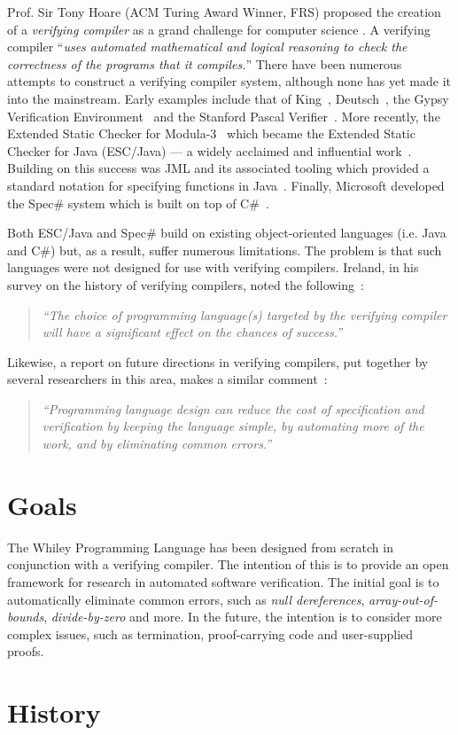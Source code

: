 Prof. Sir Tony Hoare (ACM Turing Award Winner, FRS) proposed the
creation of a {\em verifying compiler} as a grand challenge for
computer science \cite{Hoare03}.  A verifying compiler ``{\em uses
  automated mathematical and logical reasoning to check the
  correctness of the programs that it compiles.}''  There have been
numerous attempts to construct a verifying compiler system, although
none has yet made it into the mainstream.  Early examples include that
of King~\cite{King69}, Deutsch~\cite{Deutsch73}, the Gypsy
Verification Environment~\cite{Good85} and the Stanford Pascal
Verifier~\cite{LGHKMOPS95}.  More recently, the Extended Static
Checker for Modula-3~\cite{DLNS98} which became the Extended Static
Checker for Java (ESC/Java) --- a widely acclaimed and influential work~\cite{FLLNSS02}.  Building on this success was JML and its
associated tooling which provided a standard notation for specifying
functions in Java~\cite{LCCRC05}.  Finally, Microsoft %
developed the Spec\# system which is built on top of
C\#~\cite{BLS04}.%

Both ESC/Java and Spec\# build on existing object-oriented languages
(i.e. Java and C\#) but, as a result, suffer numerous limitations.
The problem is that such languages were not designed for use with
verifying compilers.  Ireland, in his survey on the history of
verifying compilers, noted the following~\cite{Ire04}:
\begin{quote} {\em ``The choice of programming language(s) targeted by
    the verifying compiler will have a significant effect on the
    chances of success.''}
\end{quote}
Likewise, a report on future directions in verifying compilers, put
together by several researchers in this area, makes a similar
comment~\cite{LABBCFHJMPSSS06}:
\begin{quote} {\em ``Programming language design can reduce the cost
    of specification and verification by keeping the language simple,
    by automating more of the work, and by eliminating common
    errors.''}
\end{quote}

\section{Goals}

The Whiley Programming Language has been designed from scratch in
conjunction with a verifying compiler.  The intention of this is to
provide an open framework for research in automated software
verification.  The initial goal is to automatically eliminate common
errors, such as {\em null dereferences}, {\em array-out-of-bounds},
{\em divide-by-zero} and more.  In the future, the intention is to
consider more complex issues, such as termination, proof-carrying code and user-supplied proofs.

\section{History}